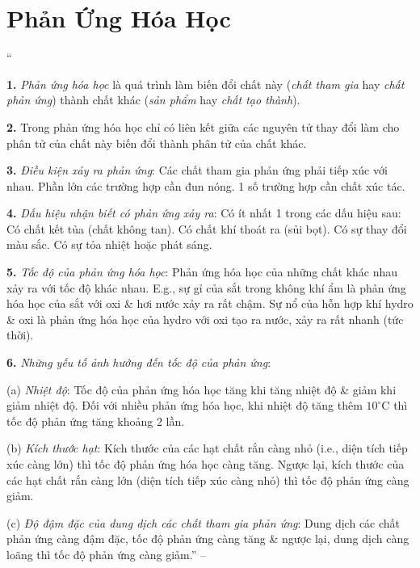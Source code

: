 \documentclass{article}
\numberwithin{equation}{section}
\begin{document}

\section{Phản Ứng Hóa Học}
``\begin{enumerate*}
	\item[\textbf{1.}] \textit{Phản ứng hóa học} là quá trình làm biến đổi chất này (\textit{chất tham gia} hay \textit{chất phản ứng}) thành chất khác (\textit{sản phẩm} hay \textit{chất tạo thành}).
	\item[\textbf{2.}] Trong phản ứng hóa học chỉ có liên kết giữa các nguyên tử thay đổi làm cho phân tử của chất này biến đổi thành phân tử của chất khác.
	\item[\textbf{3.}] \textit{Điều kiện xảy ra phản ứng}: Các chất tham gia phản ứng phải tiếp xúc với nhau. Phần lớn các trường hợp cần đun nóng. 1 số trường hợp cần chất xúc tác.
	\item[\textbf{4.}] \textit{Dấu hiệu nhận biết có phản ứng xảy ra}: Có ít nhất 1 trong các dấu hiệu sau: Có chất kết tủa (chất không tan). Có chất khí thoát ra (sủi bọt). Có sự thay đổi màu sắc. Có sự tỏa nhiệt hoặc phát sáng.
	\item[\textbf{5.}] \textit{Tốc độ của phản ứng hóa học}: Phản ứng hóa học của những chất khác nhau xảy ra với tốc độ khác nhau. E.g., sự gỉ của sắt trong không khí ẩm là phản ứng hóa học của sắt với oxi \& hơi nước xảy ra rất chậm. Sự nổ của hỗn hợp khí hydro \& oxi là phản ứng hóa học của hydro với oxi tạo ra nước, xảy ra rất nhanh (tức thời).
	\item[\textbf{6.}] \textit{Những yếu tố ảnh hưởng đến tốc độ của phản ứng}:
	\begin{enumerate*}
		\item[(a)] \textit{Nhiệt độ}: Tốc độ của phản ứng hóa học tăng khi tăng nhiệt độ \& giảm khi giảm nhiệt độ. Đối với nhiều phản ứng hóa học, khi nhiệt độ tăng thêm $10^\circ$C thì tốc độ phản ứng tăng khoảng $2$ lần.
		\item[(b)] \textit{Kích thước hạt}: Kích thước của các hạt chất rắn càng nhỏ (i.e., diện tích tiếp xúc càng lớn) thì tốc độ phản ứng hóa học càng tăng. Ngược lại, kích thước của các hạt chất rắn càng lớn (diện tích tiếp xúc càng nhỏ) thì tốc độ phản ứng càng giảm.
		\item[(c)] \textit{Độ đậm đặc của dung dịch các chất tham gia phản ứng}: Dung dịch các chất phản ứng càng đậm đặc, tốc độ phản ứng càng tăng \& ngược lại, dung dịch càng loãng thì tốc độ phản ứng càng giảm.'' -- \cite[p. 34]{Truong2021}
	\end{enumerate*}	
\end{enumerate*}
\end{document}
